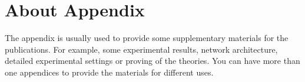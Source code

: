 
\chapter{About Appendix} %
\label{AppendixA} %
The appendix is usually used to provide some supplementary materials for the publications. For example, some experimental results, network architecture, detailed experimental settings or proving of the theories. You can have more than one appendices to provide the materials for different uses.
